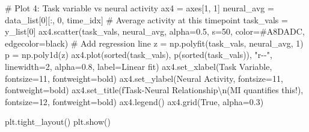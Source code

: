 \documentclass[
  11pt,
  letterpaper,
  oneside,
  openany]{book}
\newenvironment{Shaded}{\begin{snugshade}}{\end{snugshade}}
\newcommand{\BuiltInTok}[1]{\textcolor[rgb]{0.00,0.23,0.31}{#1}}
\newcommand{\CharTok}[1]{\textcolor[rgb]{0.13,0.47,0.30}{#1}}
\newcommand{\CommentTok}[1]{\textcolor[rgb]{0.37,0.37,0.37}{#1}}
\newcommand{\DecValTok}[1]{\textcolor[rgb]{0.68,0.00,0.00}{#1}}
\newcommand{\FloatTok}[1]{\textcolor[rgb]{0.68,0.00,0.00}{#1}}
\newcommand{\NormalTok}[1]{\textcolor[rgb]{0.00,0.23,0.31}{#1}}
\newcommand{\OperatorTok}[1]{\textcolor[rgb]{0.37,0.37,0.37}{#1}}
\newcommand{\SpecialStringTok}[1]{\textcolor[rgb]{0.13,0.47,0.30}{#1}}
\newcommand{\StringTok}[1]{\textcolor[rgb]{0.13,0.47,0.30}{#1}}
\newcommand{\VariableTok}[1]{\textcolor[rgb]{0.07,0.07,0.07}{#1}}
\begin{document}
\begin{Shaded}
\begin{Highlighting}[]
\CommentTok{\# Plot 4: Task variable vs neural activity}
\NormalTok{ax4 }\OperatorTok{=}\NormalTok{ axes[}\DecValTok{1}\NormalTok{, }\DecValTok{1}\NormalTok{]}
\NormalTok{neural\_avg }\OperatorTok{=}\NormalTok{ data\_list[}\DecValTok{0}\NormalTok{][:, }\DecValTok{0}\NormalTok{, time\_idx]  }\CommentTok{\# Average activity at this timepoint}
\NormalTok{task\_vals }\OperatorTok{=}\NormalTok{ y\_list[}\DecValTok{0}\NormalTok{]}
\NormalTok{ax4.scatter(task\_vals, neural\_avg, alpha}\OperatorTok{=}\FloatTok{0.5}\NormalTok{, s}\OperatorTok{=}\DecValTok{50}\NormalTok{, color}\OperatorTok{=}\StringTok{\textquotesingle{}\#A8DADC\textquotesingle{}}\NormalTok{, edgecolor}\OperatorTok{=}\StringTok{\textquotesingle{}black\textquotesingle{}}\NormalTok{)}
\CommentTok{\# Add regression line}
\NormalTok{z }\OperatorTok{=}\NormalTok{ np.polyfit(task\_vals, neural\_avg, }\DecValTok{1}\NormalTok{)}
\NormalTok{p }\OperatorTok{=}\NormalTok{ np.poly1d(z)}
\NormalTok{ax4.plot(}\BuiltInTok{sorted}\NormalTok{(task\_vals), p(}\BuiltInTok{sorted}\NormalTok{(task\_vals)), }\StringTok{"r{-}{-}"}\NormalTok{, linewidth}\OperatorTok{=}\DecValTok{2}\NormalTok{, alpha}\OperatorTok{=}\FloatTok{0.8}\NormalTok{, }
\NormalTok{         label}\OperatorTok{=}\StringTok{\textquotesingle{}Linear fit\textquotesingle{}}\NormalTok{)}
\NormalTok{ax4.set\_xlabel(}\StringTok{\textquotesingle{}Task Variable\textquotesingle{}}\NormalTok{, fontsize}\OperatorTok{=}\DecValTok{11}\NormalTok{, fontweight}\OperatorTok{=}\StringTok{\textquotesingle{}bold\textquotesingle{}}\NormalTok{)}
\NormalTok{ax4.set\_ylabel(}\StringTok{\textquotesingle{}Neural Activity\textquotesingle{}}\NormalTok{, fontsize}\OperatorTok{=}\DecValTok{11}\NormalTok{, fontweight}\OperatorTok{=}\StringTok{\textquotesingle{}bold\textquotesingle{}}\NormalTok{)}
\NormalTok{ax4.set\_title(}\SpecialStringTok{f\textquotesingle{}Task{-}Neural Relationship}\CharTok{\textbackslash{}n}\SpecialStringTok{(MI quantifies this!)\textquotesingle{}}\NormalTok{, }
\NormalTok{              fontsize}\OperatorTok{=}\DecValTok{12}\NormalTok{, fontweight}\OperatorTok{=}\StringTok{\textquotesingle{}bold\textquotesingle{}}\NormalTok{)}
\NormalTok{ax4.legend()}
\NormalTok{ax4.grid(}\VariableTok{True}\NormalTok{, alpha}\OperatorTok{=}\FloatTok{0.3}\NormalTok{)}

\NormalTok{plt.tight\_layout()}
\NormalTok{plt.show()}


\end{Highlighting}
\end{Shaded}
\end{document}
